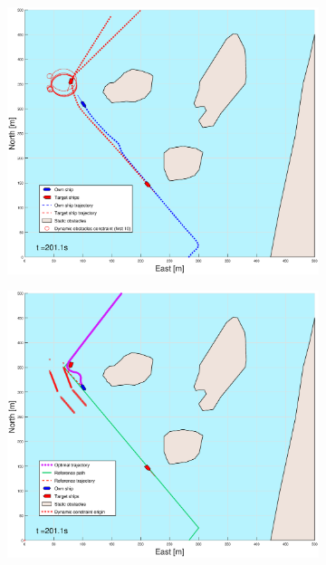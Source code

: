 \begin{figure}[ht]
\begin{subfigure}[b]{0.499\textwidth}
    \end{subfigure}
    \hfill
    \\
    \begin{subfigure}[b]{0.49\textwidth}
        \centering
        \includegraphics[width=\textwidth]{Images/Figures/Helloya/_Simple_0fig1_time=201}
    \end{subfigure}
    \hfill
    \begin{subfigure}[b]{0.499\textwidth}
        \centering
        \includegraphics[width=\textwidth]{Images/Figures/Helloya/_Simple_0fig999_time=201}

\end{subfigure}
\end{figure}
